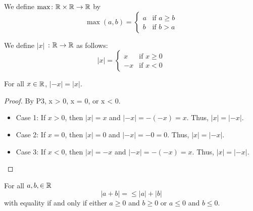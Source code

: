 \documentclass[11pt]{article}
\begin{document}
\begin{definition}
	We define \(\max \colon \mathbb R \times \mathbb R \to \mathbb R\) by \[\max(a, b) = \begin{cases}
			a & \text{if } a \geq b \\
			b & \text{if } b > a
		\end{cases}\]
\end{definition}
\begin{definition}
	We define \(|x|\) \(\colon \mathbb R \rightarrow \mathbb R\) as follows:
	\[
		|x| = \begin{cases}
			x  & \text{if } x \geq 0 \\
			-x & \text{if } x < 0
		\end{cases}
	\]
\end{definition}
\begin{proposition}
	For all \(x \in \mathbb R\), \(|-x| =  |x|\).
\end{proposition}
\begin{proof}
	By P3, x > 0, x = 0, or x < 0. \\
	\begin{itemize}
		\item Case 1: If \(x > 0\), then \(|x| = x\) and \(|-x| = -(-x) = x\). Thus, \(|x| =
		      |-x|\).
		\item Case 2: If \(x = 0\), then \(|x| = 0\) and \(|-x| = -0 = 0\). Thus, \(|x| =
		      |-x|\).
		\item Case 3: If \(x < 0\), then \(|x| = -x\) and \(|-x| = -(-x) = x\). Thus, \(|x| =
		      |-x|\).
	\end{itemize}
\end{proof}

\begin{theorem} 
	For all \(a, b, \in \mathbb R\) \[ |a + b| = \leq |a| + |b| \] with equality if and only if either \( a \geq 0\) and \( b \geq 0\) or \(a \leq
	0\) and \(b \leq 0\).
\end{theorem}
\end{document}
